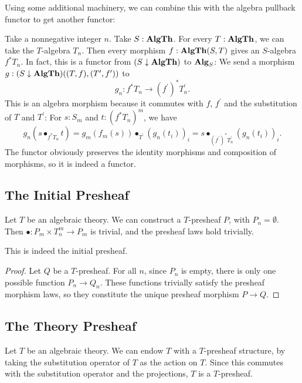 Using some additional machinery, we can combine this with the algebra pullback functor to get another functor:
\begin{definition}\label{def:theory-algebra-pullback-functor}
  Take a nonnegative integer $ n $. Take $ S : \mathbf{AlgTh} $. For every $ T : \mathbf{AlgTh} $, we can take the $ T $-algebra $ T_n $. Then every morphism $ f: \mathbf{AlgTh}(S, T) $ gives an $ S $-algebra $ f^* T_n $. In fact, this is a functor from $ (S \downarrow \mathbf{AlgTh}) $ to $ \mathbf{Alg}_{S} $: We send a morphism $ g: (S \downarrow \mathbf{AlgTh})((T, f), (T^\prime, f^\prime)) $ to
  \[ g_n: f^* T_n \to (f^\prime)^* T^\prime_n. \]
  This is an algebra morphism because it commutes with $ f $, $ f^\prime $ and the substitution of $ T $ and $ T^\prime $: For $ s: S_m $ and $ t: (f^* T_n)^m $, we have
  \[
      g_n(s \bullet_{f^* T_n} t)
    = g_m(f_m(s)) \bullet_{T^\prime} (g_n(t_i))_i
    = s \bullet_{(f^\prime)^* T^\prime_n} (g_n(t_i))_i.
  \]
  The functor obviously preserves the identity morphisms and composition of morphisms, so it is indeed a functor.
\end{definition}

\subsection{The Initial Presheaf}
\begin{example}
  Let $ T $ be an algebraic theory. We can construct a $ T $-presheaf $ P $, with $ P_n = \emptyset $. Then $ \bullet : P_m \times T_n^m \to P_m $ is trivial, and the presheaf laws hold trivially.
\end{example}

\begin{lemma}
  This is indeed the initial presheaf.
\end{lemma}
\begin{proof}
  Let $ Q $ be a $ T $-presheaf. For all $ n $, since $ P_n $ is empty, there is only one possible function $ P_n \to Q_n $. These functions trivially satisfy the presheaf morphism laws, so they constitute the unique presheaf morphism $ P \to Q $.
\end{proof}

\subsection{The Theory Presheaf}
\begin{example}
  Let $ T $ be an algebraic theory. We can endow $ T $ with a $ T $-presheaf structure, by taking the substitution operator of $ T $ as the action on $ T $. Since this commutes with the substitution operator and the projections, $ T $ is a $ T $-presheaf.
\end{example}


